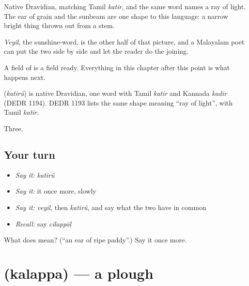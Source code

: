 Native Dravidian, matching Tamil \emph{katir}, and the same word names a ray of light. The ear of grain and the sunbeam are one shape to this language: a narrow bright thing thrown out from a stem.

\emph{Veyil}, the sunshine-word, is the other half of that picture, and a Malayalam poet can put the two side by side and let the reader do the joining.

A field of  is a field ready. Everything in this chapter after this point is what happens next.

\begin{cousinweb}
\textbf{} (\emph{katirŭ}) is native Dravidian, one word with Tamil \emph{katir} and Kannada \emph{kadir} (DEDR 1194). DEDR 1193 lists the same shape meaning \textquotedblleft{}ray of light\textquotedblright{}, with Tamil \emph{katir}.
\end{cousinweb}

\begin{grammarlens}[title={What you've built}]
Three.
\end{grammarlens}

\subsection*{Your turn}
\begin{itemize}
\raggedright
  \item \emph{Say it:} \emph{katirŭ}
  \item \emph{Say it:} it once more, slowly
  \item \emph{Say it:} \emph{veyil}, then \emph{katirŭ}, and say what the two have in common
  \item \emph{Recall:} say \emph{cilappōḷ}
\end{itemize}

\begin{tcolorbox}[breakable,colback=teal!4,colframe=teal!35!black,title={Before you move on}]
What does  mean? (\textquotedblleft{}an ear of ripe paddy\textquotedblright{}.) Say it once more.
\end{tcolorbox}
\section[\texorpdfstring{\ml{കലപ്പ} (kalappa)}{കലപ്പ (kalappa)}]{ (kalappa) — a plough}

\label{lesson:ML-C66-plough}




